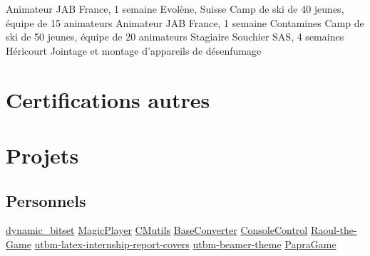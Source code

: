 \documentclass[a4paper,10pt,sans]{moderncv}
\begin{document}
			\vspace{5pt}
			{Animateur}
			{JAB France, 1 semaine}
			{Evolène, Suisse}
			{Camp de ski de 40 jeunes, équipe de 15 animateurs}
			{}
			{Animateur}
			{JAB France, 1 semaine}
			{Contamines}
			{Camp de ski de 50 jeunes, équipe de 20 animateurs}
			{}
			{Stagiaire}
			{Souchier SAS, 4 semaines}
			{Héricourt}
			{Jointage et montage d'appareils de désenfumage}
			{}

	\newpage


	\section{Certifications autres}


	\vspace*{\deletedSpace}
	\section{Projets}
		\subsection{Personnels}
				{\href{https://github.com/pinam45/dynamic_bitset}{dynamic\_bitset}}
				{\href{https://github.com/pinam45/MagicPlayer}{MagicPlayer}}
				{\href{https://github.com/pinam45/CMutils}{CMutils}}
				{\href{https://github.com/pinam45/BaseConverter}{BaseConverter}}
				{\href{https://github.com/pinam45/ConsoleControl}{ConsoleControl}}
				{\href{https://github.com/TiWinDeTea/Raoul-the-Game}{Raoul-the-Game}}
				{\href{https://github.com/pinam45/utbm-latex-internship-report-covers}{utbm-latex-internship-report-covers}}
				{\href{https://github.com/pinam45/utbm-beamer-theme}{utbm-beamer-theme}}
				{\href{https://github.com/TiWinDeTea/PapraGame}{PapraGame}}
\end{document}
